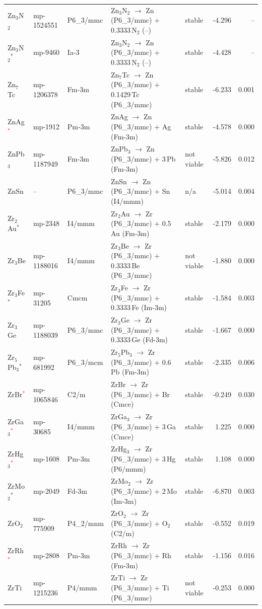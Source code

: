 \begin{longtable}{@{}ll l@{\hspace{4pt}} p{4.6cm} l@{\hspace{4pt}} rr@{}}
Zn$_{3}$N$_{2}$ & mp-1524551 & P6\_3/mmc & Zn$_{3}$N$_{2}$ $\to$ Zn (P6\_3/mmc) $+$ 0.3333\,N$_{2}$ (--) & stable & -4.296 & -- \\
Zn$_{3}$N$_{2}$$^*$ & mp-9460 & Ia-3 & Zn$_{3}$N$_{2}$ $\to$ Zn (P6\_3/mmc) $+$ 0.3333\,N$_{2}$ (--) & stable & -4.428 & -- \\
Zn$_{7}$Tc & mp-1206378 & Fm-3m & Zn$_{7}$Tc $\to$ Zn (P6\_3/mmc) $+$ 0.1429\,Tc (P6\_3/mmc) & stable & -6.233 & 0.001 \\
ZnAg\textcolor{red}{$^*$} & mp-1912 & Pm-3m & ZnAg $\to$ Zn (P6\_3/mmc) $+$ Ag (Fm-3m) & stable & -4.578 & 0.000 \\
ZnPb$_{3}$ & mp-1187949 & Fm-3m & ZnPb$_{3}$ $\to$ Zn (P6\_3/mmc) $+$ 3\,Pb (Fm-3m) & not viable & -5.826 & 0.012 \\
ZnSn & -- & P6\_3/mmc & ZnSn $\to$ Zn (P6\_3/mmc) $+$ Sn (I4/mmm) & n/a & -5.014 & 0.004 \\
Zr$_{2}$Au$^*$ & mp-2348 & I4/mmm & Zr$_{2}$Au $\to$ Zr (P6\_3/mmc) $+$ 0.5\,Au (Fm-3m) & stable & -2.179 & 0.000 \\
Zr$_{3}$Be & mp-1188016 & I4/mmm & Zr$_{3}$Be $\to$ Zr (P6\_3/mmc) $+$ 0.3333\,Be (P6\_3/mmc) & not viable & -1.880 & 0.000 \\
Zr$_{3}$Fe$^*$ & mp-31205 & Cmcm & Zr$_{3}$Fe $\to$ Zr (P6\_3/mmc) $+$ 0.3333\,Fe (Im-3m) & stable & -1.584 & 0.003 \\
Zr$_{3}$Ge & mp-1188039 & P6\_3/mmc & Zr$_{3}$Ge $\to$ Zr (P6\_3/mmc) $+$ 0.3333\,Ge (Fd-3m) & stable & -1.667 & 0.000 \\
Zr$_{5}$Pb$_{3}$$^*$ & mp-681992 & P6\_3/mcm & Zr$_{5}$Pb$_{3}$ $\to$ Zr (P6\_3/mmc) $+$ 0.6\,Pb (Fm-3m) & stable & -2.335 & 0.006 \\
ZrBr\textcolor{red}{$^*$} & mp-1065846 & C2/m & ZrBr $\to$ Zr (P6\_3/mmc) $+$ Br (Cmce) & stable & -0.249 & 0.030 \\
ZrGa$_{3}$\textcolor{red}{$^*$} & mp-30685 & I4/mmm & ZrGa$_{3}$ $\to$ Zr (P6\_3/mmc) $+$ 3\,Ga (Cmce) & stable & 1.225 & 0.000 \\
ZrHg$_{3}$\textcolor{red}{$^*$} & mp-1608 & Pm-3m & ZrHg$_{3}$ $\to$ Zr (P6\_3/mmc) $+$ 3\,Hg (P6/mmm) & stable & 1.108 & 0.000 \\
ZrMo$_{2}$$^*$ & mp-2049 & Fd-3m & ZrMo$_{2}$ $\to$ Zr (P6\_3/mmc) $+$ 2\,Mo (Im-3m) & stable & -6.870 & 0.003 \\
ZrO$_{2}$ & mp-775909 & P4\_2/mnm & ZrO$_{2}$ $\to$ Zr (P6\_3/mmc) $+$ O$_{2}$ (C2/m) & stable & -0.552 & 0.019 \\
ZrRh\textcolor{red}{$^*$} & mp-2808 & Pm-3m & ZrRh $\to$ Zr (P6\_3/mmc) $+$ Rh (Fm-3m) & stable & -1.156 & 0.016 \\
ZrTi & mp-1215236 & P4/mmm & ZrTi $\to$ Zr (P6\_3/mmc) $+$ Ti (P6\_3/mmc) & not viable & -0.253 & 0.000 \\
\end{longtable}
